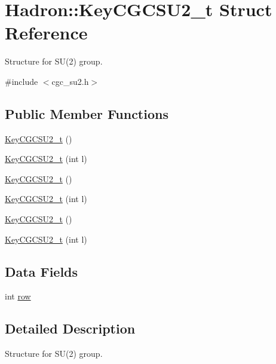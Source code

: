\hypertarget{structHadron_1_1KeyCGCSU2__t}{}\section{Hadron\+:\+:Key\+C\+G\+C\+S\+U2\+\_\+t Struct Reference}
\label{structHadron_1_1KeyCGCSU2__t}


Structure for S\+U(2) group.  




{\ttfamily \#include $<$cgc\+\_\+su2.\+h$>$}

\subsection*{Public Member Functions}
\begin{DoxyCompactItemize}
\item 
\mbox{\hyperlink{structHadron_1_1KeyCGCSU2__t_ad694c4b6fba602e16f67dc25f4d1b480}{Key\+C\+G\+C\+S\+U2\+\_\+t}} ()
\item 
\mbox{\hyperlink{structHadron_1_1KeyCGCSU2__t_abe46c2e3bffc2fd9818d7da7c91983cc}{Key\+C\+G\+C\+S\+U2\+\_\+t}} (int l)
\item 
\mbox{\hyperlink{structHadron_1_1KeyCGCSU2__t_ad694c4b6fba602e16f67dc25f4d1b480}{Key\+C\+G\+C\+S\+U2\+\_\+t}} ()
\item 
\mbox{\hyperlink{structHadron_1_1KeyCGCSU2__t_abe46c2e3bffc2fd9818d7da7c91983cc}{Key\+C\+G\+C\+S\+U2\+\_\+t}} (int l)
\item 
\mbox{\hyperlink{structHadron_1_1KeyCGCSU2__t_ad694c4b6fba602e16f67dc25f4d1b480}{Key\+C\+G\+C\+S\+U2\+\_\+t}} ()
\item 
\mbox{\hyperlink{structHadron_1_1KeyCGCSU2__t_abe46c2e3bffc2fd9818d7da7c91983cc}{Key\+C\+G\+C\+S\+U2\+\_\+t}} (int l)
\end{DoxyCompactItemize}
\subsection*{Data Fields}
\begin{DoxyCompactItemize}
\item 
int \mbox{\hyperlink{structHadron_1_1KeyCGCSU2__t_a96e0da2b64dff83f72b594bc4fef5c75}{row}}
\end{DoxyCompactItemize}


\subsection{Detailed Description}
Structure for S\+U(2) group. 

